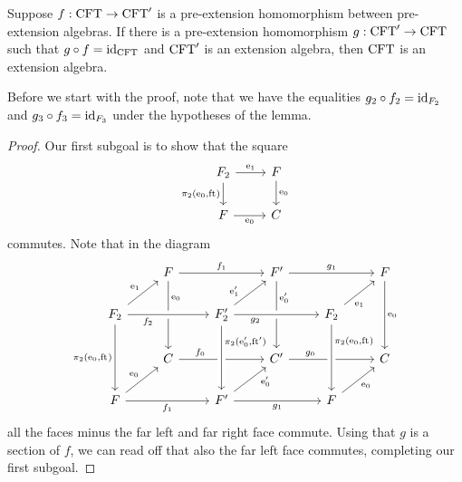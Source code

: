 \begin{lem}\label{esys-retract}
Suppose $f:\mathrm{CFT}\to\mathrm{CFT}'$ is a pre-extension homomorphism between
pre-extension algebras. If there is a pre-extension homomorphism $g:\mathrm{CFT}'\to
\mathrm{CFT}$ such that $g\circ f={\mathrm{id}_{\mathrm{CFT}}}$ and $\mathrm{CFT}'$ is an extension
algebra, then $\mathrm{CFT}$ is an extension algebra.
\end{lem}

Before we start with the proof, note that we have the equalities
$g_2\circ f_2={\mathrm{id}_{F_2}}$ and $g_3\circ f_3={\mathrm{id}_{F_3}}$
under the hypotheses of the lemma.

\begin{proof}
Our first subgoal is to show that the square
\begin{equation*}
\begin{tikzcd}
\stesysf_2 
  \ar{r}{\efamext} 
  \ar{d}[swap]{\pullbackpr{2}{\ectxext}{\eft}} 
  & 
\stesysf 
  \ar{d}{\ectxext}
  \\
\stesysf
  \ar{r}[swap]{\ectxext} 
  & 
\stesysc
\end{tikzcd}
\end{equation*}
commutes. Note that in the diagram
\begin{equation*}
\begin{tikzcd}
  {}
  & 
\stesysf
  \ar{dd}[near start]{\ectxext}
  \ar{rr}{f_1}
  &
  &
\stesysf'
  \ar{dd}[near start]{\ectxext'}
  \ar{rr}{g_1}
  &
  &
\stesysf
  \ar{dd}{\ectxext}
  \\
\stesysf_2
  \ar{dd}[swap]{\pullbackpr{2}{\ectxext}{\eft}}
  \ar[crossing over]{rr}[swap,near start]{f_2}
  \ar{ur}{\efamext}
  &
  &
\stesysf_2'
  \ar{ur}[near start]{\efamext'}
  \ar[crossing over]{rr}[swap,near start]{g_2}
  &
  &
\stesysf_2
  \ar{ur}[swap,near start]{\efamext}
  \\
  {}
  &
\stesysc
  \ar{rr}[near start]{f_0}
  &
  &
\stesysc'
  \ar{rr}[near start]{g_0}
  &
  &
\stesysc
  \\
\stesysf 
  \ar{rr}[swap]{f_1}
  \ar{ur}{\ectxext}
  &
  &
\stesysf' 
  \ar[crossing over,leftarrow]{uu}[near end,swap]{\pullbackpr{2}{\ectxext'}{\eft'}}
  \ar{ur}[swap,near end]{\ectxext'}
  \ar{rr}[swap]{g_1}
  &
  &
\stesysf
  \ar[crossing over,leftarrow]{uu}[near end,swap]{\pullbackpr{2}{\ectxext}{\eft}}
  \ar{ur}[swap]{\ectxext}
\end{tikzcd}
\end{equation*}
all the faces minus the far left and far right face commute. Using that $g$
is a section of $f$, we can read off that also the far left face commutes,
completing our first subgoal.
 

\end{proof}
